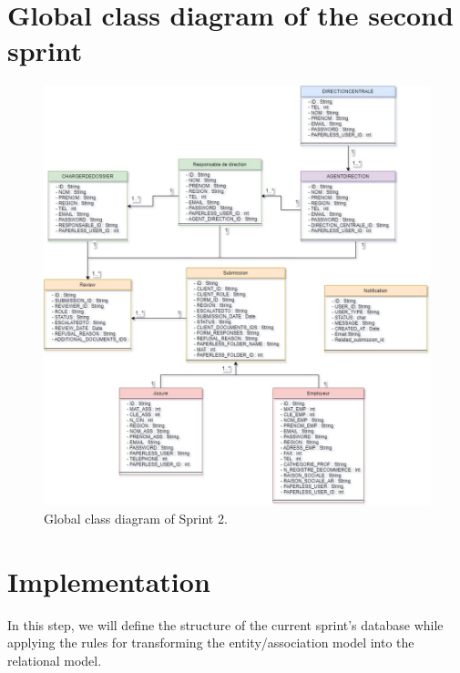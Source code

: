 \section{Global class diagram of the second sprint}
\begin{figure}[h!]
    \centering
    \includegraphics[width=1\textwidth]{figures/global class dia s2.jpg}
    \caption{Global class diagram of Sprint 2.}
\end{figure}
\clearpage
\section{Implementation}
In this step, we will define the structure of the current sprint's database while applying the rules for transforming the entity/association model into the relational model.

